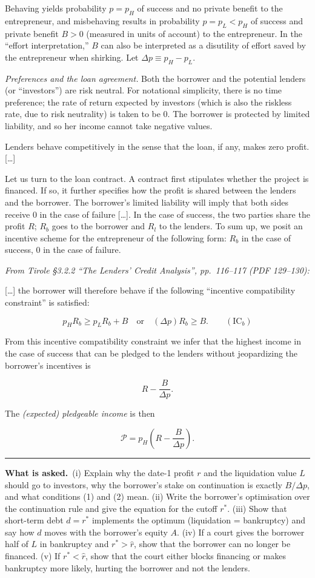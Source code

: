 \documentclass[11pt,a4paper]{article}
\newcommand{\asked}{\par\medskip\noindent\textbf{What is asked.}~}
\newcommand{\stmtend}{\par\endgroup\nopagebreak\noindent\rule{\linewidth}{0.4pt}\par\medskip}
\begin{document}
Behaving yields probability \(p = p_H\) of success and no private benefit to the entrepreneur, and
misbehaving results in probability \(p = p_L < p_H\) of success and private benefit \(B > 0\)
(measured in units of account) to the entrepreneur. In the ``effort interpretation,'' \(B\) can also
be interpreted as a disutility of effort saved by the entrepreneur when shirking. Let
\(\Delta p \equiv p_H - p_L\).

\emph{Preferences and the loan agreement.} Both the borrower and the potential lenders (or
``investors'') are risk neutral. For notational simplicity, there is no time preference; the rate of
return expected by investors (which is also the riskless rate, due to risk neutrality) is taken to
be 0. The borrower is protected by limited liability, and so her income cannot take negative values.

Lenders behave competitively in the sense that the loan, if any, makes zero profit. {[}\ldots{]}

Let us turn to the loan contract. A contract first stipulates whether the project is financed. If
so, it further specifies how the profit is shared between the lenders and the borrower. The
borrower's limited liability will imply that both sides receive 0 in the case of failure
{[}\ldots{]}. In the case of success, the two parties share the profit \(R\); \(R_b\) goes to the
borrower and \(R_l\) to the lenders. To sum up, we posit an incentive scheme for the entrepreneur of
the following form: \(R_b\) in the case of success, 0 in the case of failure.

\emph{From Tirole §3.2.2 ``The Lenders' Credit Analysis'', pp.~116--117 (PDF 129--130):}

{[}\ldots{]} the borrower will therefore behave if the following ``incentive compatibility
constraint'' is satisfied:

\[p_H R_b \geqslant p_L R_b + B \quad \text{or} \quad (\Delta p) R_b \geqslant B. \qquad (\text{IC}_b)\]

From this incentive compatibility constraint we infer that the highest income in the case of success
that can be pledged to the lenders without jeopardizing the borrower's incentives is

\[R - \frac{B}{\Delta p}.\]

The \emph{(expected) pledgeable income} is then

\[\mathcal{P} = p_H\left(R - \frac{B}{\Delta p}\right).\]
\stmtend

\asked (i) Explain why the date-1 profit $r$ and the liquidation value $L$ should go to investors, why the
borrower's stake on continuation is exactly $B/\Delta p$, and what conditions (1) and (2) mean. (ii) Write
the borrower's optimisation over the continuation rule and give the equation for the cutoff $r^*$.
(iii) Show that short-term debt $d=r^*$ implements the optimum (liquidation = bankruptcy) and say how
$d$ moves with the borrower's equity $A$. (iv) If a court gives the borrower half of $L$ in bankruptcy and
$r^*>\hat r$, show that the borrower can no longer be financed. (v) If $r^*<\hat r$, show that the court
either blocks financing or makes bankruptcy more likely, hurting the borrower and not the lenders.
\end{document}
